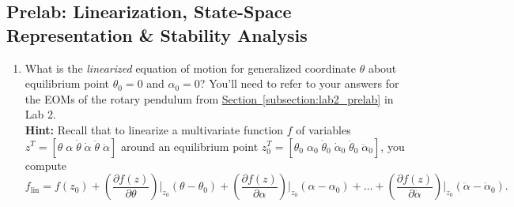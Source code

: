\documentclass[12pt]{report}
\begin{document}
\subsection{Prelab: Linearization, State-Space Representation \& Stability Analysis}\label{subsection:lab3_prelab}
\begin{enumerate}
    \item What is the \emph{linearized} equation of motion for generalized coordinate $\theta$ about equilibrium point $\theta_0 = 0$ and $\alpha_0 = 0$? You'll need to refer to your answers for the EOMs of the rotary pendulum from \hyperref[subsection:lab2_prelab]{Section~\ref{subsection:lab2_prelab}} in Lab 2.\\
          \textbf{Hint:} Recall that to linearize a multivariate function $f$ of variables $z^T = [\theta \; \alpha \; \dot{\theta} \; \dot{\alpha} \; \ddot{\theta} \; \ddot{\alpha}]$ around an equilibrium point $z_{0}^T = [\theta_0 \; \alpha_0 \; \dot{\theta}_0 \; \dot{\alpha}_0 \; \ddot{\theta}_0 \; \ddot{\alpha}_0]$, you compute
          \[
              f_\text{lin} = f(z_0) + \left(\frac{\partial f(z)}{\partial \theta}\right) \bigg|_{z_0}  (\theta - \theta_0) +  \left(\frac{\partial f(z)}{\partial \alpha}\right) \bigg|_{z_0}  (\alpha - \alpha_0) + \dots +  \left(\frac{\partial f(z)}{\partial \ddot{\alpha}}\right) \bigg|_{z_0}  (\ddot{\alpha} - \ddot{\alpha}_0).
          \]


\end{enumerate}
\end{document}
